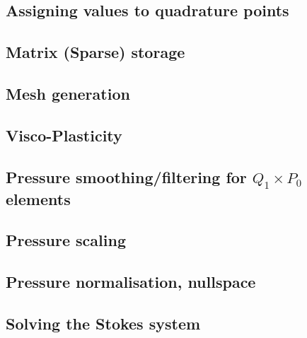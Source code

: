 \subsection{Assigning values to quadrature points}  %
\newpage %
\subsection{Matrix (Sparse) storage}  %
\newpage %
\subsection{Mesh generation} \label{sec:meshes}  %
\newpage %
\subsection{Visco-Plasticity}  %
\newpage %
\subsection{Pressure smoothing/filtering for $Q_1\times P_0$ elements \label{psmoothing}} 
\newpage %
\subsection{Pressure scaling}  %
\newpage %
\subsection{Pressure normalisation, nullspace\label{ss_pnorm}}  %
\newpage %
\subsection{Solving the Stokes system \label{sec:solvers}}  %
\newpage %
